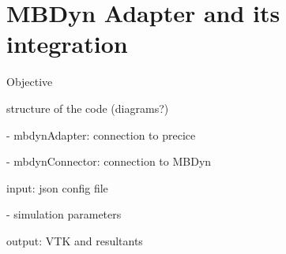 \chapter{MBDyn Adapter and its integration}
\label{cha:adapter}

Objective

structure of the code (diagrams?)

- mbdynAdapter: connection to precice

- mbdynConnector: connection to MBDyn

input: json config file

- simulation parameters

output: VTK and resultants






